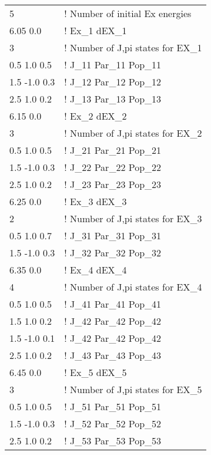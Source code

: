 \documentclass[
10pt,
showpacs,preprintnumbers,nofootinbib,
amsmath,amssymb,
aps,prc,groupedaddress,superscriptaddress,
notitlepage,showkeys
]{revtex4-1}
\begin{document}
\begin{center}
\begin{tabular}{| p{3 cm} p{7 cm}|}
\hline
   5                     &                 !   Number of initial Ex energies\\
  6.05  0.0           &               ! Ex\_1  dEX\_1 \\
   3                      &               ! Number of J,pi states for EX\_1\\
  0.5  1.0  0.5      &               ! J\_11  Par\_11 Pop\_11\\
  1.5  -1.0  0.3      &               ! J\_12  Par\_12 Pop\_12\\
  2.5  1.0  0.2      &               ! J\_13  Par\_13 Pop\_13\\
  6.15  0.0           &               ! Ex\_2  dEX\_2 \\
   3                      &               ! Number of J,pi states for EX\_2\\
  0.5  1.0  0.5      &               ! J\_21  Par\_21 Pop\_21\\
  1.5  -1.0  0.3      &               ! J\_22  Par\_22 Pop\_22\\
  2.5  1.0  0.2      &               ! J\_23  Par\_23 Pop\_23\\
  6.25  0.0           &               ! Ex\_3  dEX\_3 \\
   2                      &               ! Number of J,pi states for EX\_3\\
  0.5  1.0  0.7      &               ! J\_31  Par\_31 Pop\_31\\
  1.5  -1.0  0.3      &               ! J\_32  Par\_32 Pop\_32\\
  6.35  0.0           &               ! Ex\_4  dEX\_4 \\
   4                      &               ! Number of J,pi states for EX\_4\\
  0.5  1.0  0.5      &               ! J\_41  Par\_41 Pop\_41\\
  1.5  1.0  0.2      &               ! J\_42  Par\_42 Pop\_42\\
  1.5  -1.0  0.1      &               ! J\_42  Par\_42 Pop\_42\\
  2.5  1.0  0.2      &               ! J\_43  Par\_43 Pop\_43\\
  6.45  0.0           &               ! Ex\_5  dEX\_5 \\
   3                      &               ! Number of J,pi states for EX\_5\\
  0.5  1.0  0.5      &               ! J\_51  Par\_51 Pop\_51\\
  1.5  -1.0  0.3      &               ! J\_52  Par\_52 Pop\_52\\
  2.5  1.0  0.2      &               ! J\_53  Par\_53 Pop\_53\\
\hline
\end{tabular}
\end{center}
\end{document}
